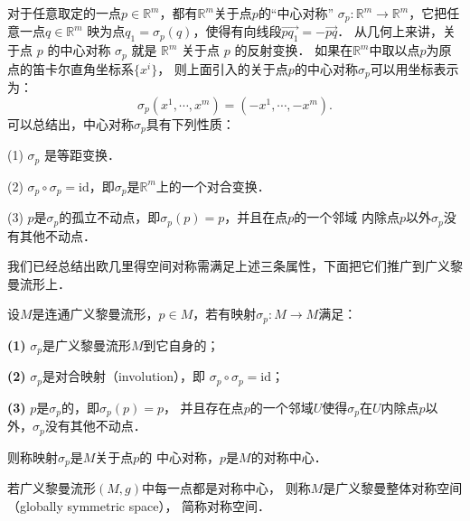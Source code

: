 对于任意取定的一点$p \in \mathbb{R}^m$，都有$\mathbb{R}^m$关于点$p$的“中心对称”
$\sigma_p: \mathbb{R}^m \rightarrow \mathbb{R}^m$，它把任意一点$q \in \mathbb{R}^m$
映为点$q_1=\sigma_p(q)$，使得有向线段$\overrightarrow{p q_1}=-\overrightarrow{p q}$．
从几何上来讲，关于点 $p$ 的中心对称 $\sigma_p$ 就是 $\mathbb{R}^m$ 关于点 $p$ 的反射变换．
如果在$\mathbb{R}^m$中取以点$p$为原点的笛卡尔直角坐标系$\{x^i\}$，
则上面引入的关于点$p$的中心对称$\sigma_p$可以用坐标表示为：
\begin{equation*}
    \sigma_p\left(x^1, \cdots, x^m\right)=\left(-x^1, \cdots,-x^m\right) .
\end{equation*}
可以总结出，中心对称$\sigma_p$具有下列性质：

(1) $\sigma_p$ 是等距变换．

(2) $\sigma_p \circ \sigma_p=\mathrm{id}$，即$\sigma_p$是$\mathbb{R}^m$上的一个对合变换．

(3) $p$是$\sigma_p$的孤立不动点，即$\sigma_p(p)=p$，并且在点$p$的一个邻域
内除点$p$以外$\sigma_p$没有其他不动点．


我们已经总结出欧几里得空间对称需满足上述三条属性，下面把它们推广到广义黎曼流形上．

\begin{definition}\label{chhss:def_center-sym}
    设$M$是连通广义黎曼流形，$p \in M$，若有映射$\sigma_p: M \rightarrow M$满足：
    
    {\bfseries (1)} $\sigma_p$是广义黎曼流形$M$到它自身的；
    
    {\bfseries (2)} $\sigma_p$是{\heiti 对合}映射（involution），即 $\sigma_p \circ \sigma_p=\mathrm{id}$；
    
    {\bfseries (3)} $p$是$\sigma_p$的，即$\sigma_p(p)=p$，
    并且存在点$p$的一个邻域$U$使得$\sigma_p$在$U$内除点$p$以外，$\sigma_p$没有其他不动点．
    
    则称映射$\sigma_p$是$M$关于点$p$的 {\heiti 中心对称}，$p$是$M$的{\heiti 对称中心}．
\end{definition}

\begin{definition}\label{chhss:def_global-symmetry}
    若广义黎曼流形$(M,g)$中每一点都是对称中心，
    则称$M$是{\heiti 广义黎曼整体对称空间}（globally symmetric space）， 
    简称{\heiti 对称空间}．
\end{definition}

